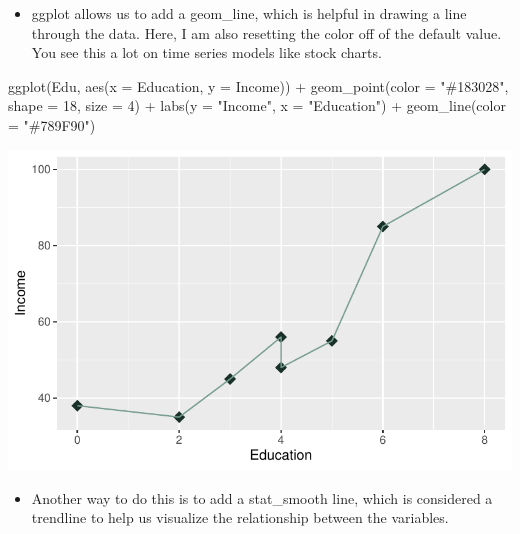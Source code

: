 \documentclass[
  letterpaper,
  DIV=11,
  numbers=noendperiod]{scrreprt}
\newenvironment{Shaded}{\begin{snugshade}}{\end{snugshade}}
\newcommand{\AttributeTok}[1]{\textcolor[rgb]{0.40,0.45,0.13}{#1}}
\newcommand{\DecValTok}[1]{\textcolor[rgb]{0.68,0.00,0.00}{#1}}
\newcommand{\FunctionTok}[1]{\textcolor[rgb]{0.28,0.35,0.67}{#1}}
\newcommand{\NormalTok}[1]{\textcolor[rgb]{0.00,0.23,0.31}{#1}}
\newcommand{\SpecialCharTok}[1]{\textcolor[rgb]{0.37,0.37,0.37}{#1}}
\newcommand{\StringTok}[1]{\textcolor[rgb]{0.13,0.47,0.30}{#1}}
\providecommand{\tightlist}{%
  \setlength{\itemsep}{0pt}\setlength{\parskip}{0pt}}\usepackage{longtable,booktabs,array}
\begin{document}
\begin{itemize}
\tightlist
\item
  ggplot allows us to add a geom\_line, which is helpful in drawing a
  line through the data. Here, I am also resetting the color off of the
  default value. You see this a lot on time series models like stock
  charts.
\end{itemize}

\begin{Shaded}
\begin{Highlighting}[]
\FunctionTok{ggplot}\NormalTok{(Edu, }\FunctionTok{aes}\NormalTok{(}\AttributeTok{x =}\NormalTok{ Education, }\AttributeTok{y =}\NormalTok{ Income)) }\SpecialCharTok{+} \FunctionTok{geom\_point}\NormalTok{(}\AttributeTok{color =} \StringTok{"\#183028"}\NormalTok{,}
    \AttributeTok{shape =} \DecValTok{18}\NormalTok{, }\AttributeTok{size =} \DecValTok{4}\NormalTok{) }\SpecialCharTok{+} \FunctionTok{labs}\NormalTok{(}\AttributeTok{y =} \StringTok{"Income"}\NormalTok{, }\AttributeTok{x =} \StringTok{"Education"}\NormalTok{) }\SpecialCharTok{+} \FunctionTok{geom\_line}\NormalTok{(}\AttributeTok{color =} \StringTok{"\#789F90"}\NormalTok{)}
\end{Highlighting}
\end{Shaded}

\includegraphics{dataviz_files/figure-pdf/unnamed-chunk-48-1.pdf}

\begin{itemize}
\tightlist
\item
  Another way to do this is to add a stat\_smooth line, which is
  considered a trendline to help us visualize the relationship between
  the variables.
\end{itemize}
\end{document}
